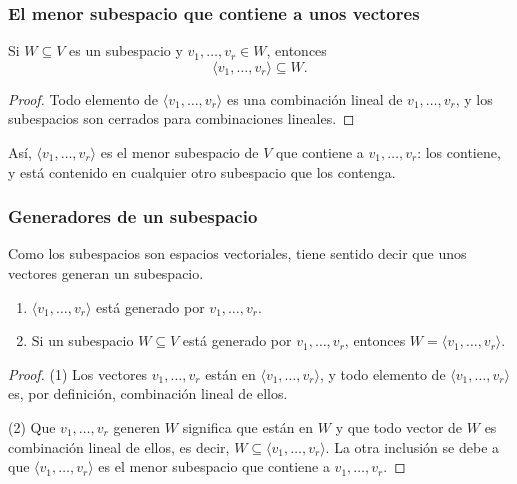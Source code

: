 \begin{frame}
    \frametitle{El menor subespacio que contiene a unos vectores}

    \begin{proposition}
        Si $W\subseteq V$ es un subespacio y $v_1,\ldots,v_r\in W$, entonces
        \[
            \langle v_1,\ldots,v_r\rangle\subseteq W.
        \]
    \end{proposition}

    \begin{proof}
        Todo elemento de $\langle v_1,\ldots,v_r\rangle$ es una combinación
        lineal de $v_1,\ldots,v_r$, y los subespacios son cerrados para
        combinaciones lineales.
    \end{proof}

    \medskip

    Así, $\langle v_1,\ldots,v_r\rangle$ es el \alert{menor subespacio}
    de $V$ que contiene a $v_1,\ldots,v_r$: los contiene, y está contenido
    en cualquier otro subespacio que los contenga.
\end{frame}

\begin{frame}
    \frametitle{Generadores de un subespacio}

    Como los subespacios son espacios vectoriales, tiene sentido decir que
    unos vectores \alert{generan} un subespacio.

    \begin{proposition}
        \begin{enumerate}
            \item $\langle v_1,\ldots,v_r\rangle$ está generado por
            $v_1,\ldots,v_r$.
            \item Si un subespacio $W\subseteq V$ está generado por
            $v_1,\ldots,v_r$, entonces $W=\langle v_1,\ldots,v_r\rangle$.
        \end{enumerate}
    \end{proposition}

    \begin{proof}
        (1) Los vectores $v_1,\ldots,v_r$ están en
        $\langle v_1,\ldots,v_r\rangle$, y todo elemento de
        $\langle v_1,\ldots,v_r\rangle$ es, por definición, combinación
        lineal de ellos.

        (2) Que $v_1,\ldots,v_r$ generen $W$ significa que están en $W$ y que
        todo vector de $W$ es combinación lineal de ellos, es decir,
        $W\subseteq\langle v_1,\ldots,v_r\rangle$. La otra inclusión se debe
        a que $\langle v_1,\ldots,v_r\rangle$ es el menor subespacio que
        contiene a $v_1,\ldots,v_r$.
    \end{proof}
\end{frame}

